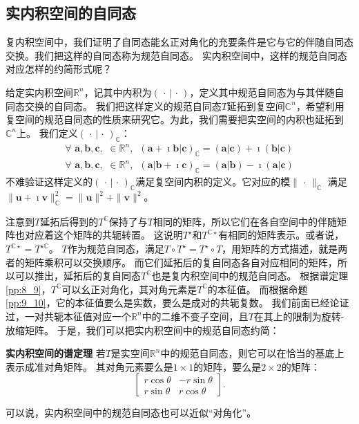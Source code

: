 \documentclass[12pt,UTF8,fontset=none]{ctexbook}
\begin{document}
\subsection{实内积空间的自同态}
复内积空间中，我们证明了自同态能幺正对角化的充要条件是它与它的伴随自同态交换。我们把这样的自同态称为规范自同态。
实内积空间中，这样的规范自同态对应怎样的约简形式呢？

给定实内积空间$\mathbb{R}^n$，记其中内积为$(\,\cdot\,|\,\cdot\,)$，定义其中规范自同态为与其伴随自同态交换的自同态。
我们把这样定义的规范自同态$T$延拓到复空间$\mathbb{C}^n$，希望利用复空间的规范自同态的性质来研究它。为此，我们需要把实空间的内积也延拓到$\mathbb{C}^n$上。
我们定义$(\,\cdot\,|\,\cdot\,)_\mathbb{C}$：
\begin{align*}
    \forall \,\, \mathbf{a}, \mathbf{b}, \mathbf{c}, \,\, \in \mathbb{R}^n , \,\,\, (\mathbf{a} + \imath  \mathbf{b}|\mathbf{c})_\mathbb{C} = (\mathbf{a}|\mathbf{c}) + \imath (\mathbf{b}|\mathbf{c})  \\
    \forall \,\, \mathbf{a}, \mathbf{b}, \mathbf{c}, \,\, \in \mathbb{R}^n , \,\,\, (\mathbf{a}|\mathbf{b} + \imath  \mathbf{c})_\mathbb{C} = (\mathbf{a}|\mathbf{b}) - \imath (\mathbf{a}|\mathbf{c}) 
\end{align*}
不难验证这样定义的$(\,\cdot\,|\,\cdot\,)_\mathbb{C}$满足复空间内积的定义。它对应的模$\| \, \cdot \, \|_\mathbb{C}$
满足$\| \mathbf{u} + \imath  \mathbf{v}\|_\mathbb{C}^2 = \|\mathbf{u}\|^2 + \|\mathbf{v}\|^2$。

注意到$T$延拓后得到的$T^\mathbb{C}$保持了与$T$相同的矩阵，所以它们在各自空间中的伴随矩阵也对应着这个矩阵的共轭转置。
这说明$T^\star$和$T^{\mathbb{C}\star}$有相同的矩阵表示。或者说，$T^{\mathbb{C}\star} = T^{\star\mathbb{C}}$。
$T$作为规范自同态，满足$T\circ T^\star = T^\star \circ T$，用矩阵的方式描述，就是两者的矩阵乘积可以交换顺序。
而它们延拓后的复自同态各自对应相同的矩阵，所以可以推出，延拓后的复自同态$T^\mathbb{C}$也是复内积空间中的规范自同态。
根据谱定理\ref{pp:8_9}，$T^\mathbb{C}$可以幺正对角化，其对角元素是$T^\mathbb{C}$的本征值。
而根据命题\ref{pp:9_10}，它的本征值要么是实数，要么是成对的共轭复数。
我们前面已经论证过，一对共轭本征值对应一个$\mathbb{R}^n$中的二维不变子空间，且$T$在其上的限制为旋转-放缩矩阵。
于是，我们可以把实内积空间中的规范自同态约简：
\begin{pp}\textbf{实内积空间的谱定理 }\label{pp:9_12}
    若$T$是实空间$\mathbb{R}^n$中的规范自同态，则它可以在恰当的基底上表示成准对角矩阵。
    其对角元素要么是$1\times 1$的矩阵，要么是$2\times 2$的矩阵：
    $$ \begin{bmatrix}
        r\cos\theta & -r\sin\theta \\ r\sin\theta & r\cos\theta
    \end{bmatrix}.$$
\end{pp}
可以说，实内积空间中的规范自同态也可以近似“对角化”。
\end{document}
